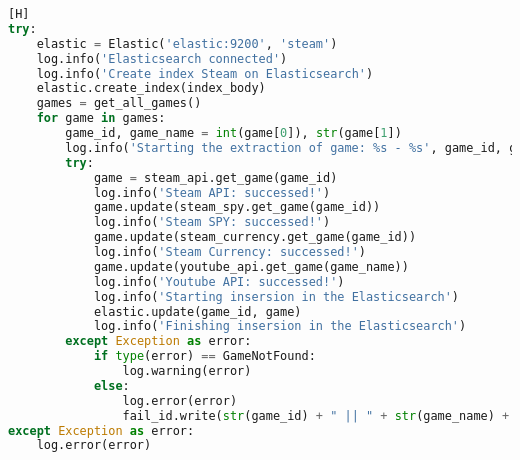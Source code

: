 \begin{lstlisting}[language={Python}, caption = {Código da \textit{\textbf{Main}}}, label = {code:main}] [H]
try:
	elastic = Elastic('elastic:9200', 'steam')
	log.info('Elasticsearch connected')
	log.info('Create index Steam on Elasticsearch')
	elastic.create_index(index_body)
	games = get_all_games()
	for game in games:
		game_id, game_name = int(game[0]), str(game[1])
		log.info('Starting the extraction of game: %s - %s', game_id, game_name)
		try:
			game = steam_api.get_game(game_id)
			log.info('Steam API: successed!')
			game.update(steam_spy.get_game(game_id))
			log.info('Steam SPY: successed!')
			game.update(steam_currency.get_game(game_id))
			log.info('Steam Currency: successed!')
			game.update(youtube_api.get_game(game_name))
			log.info('Youtube API: successed!')
			log.info('Starting insersion in the Elasticsearch')
			elastic.update(game_id, game)
			log.info('Finishing insersion in the Elasticsearch')
		except Exception as error:
			if type(error) == GameNotFound:
				log.warning(error)
			else:
				log.error(error)
				fail_id.write(str(game_id) + " || " + str(game_name) + "\n")
except Exception as error:
	log.error(error)
\end{lstlisting}
